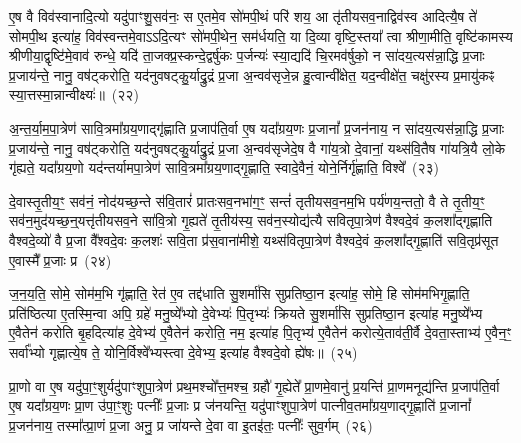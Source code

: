 ए॒ष वै विव॑स्वानादि॒त्यो यदु॑पाꣳशु॒सव॑नः॒ स ए॒तमे॒व सो॑मपी॒थं परि॑ शय॒ आ तृ॑तीयसव॒नाद्विव॑स्व आदित्यै॒ष ते॑ सोमपी॒थ इत्या॑ह॒ विव॑स्वन्तमे॒वा\-ऽऽ\-दि॒त्यꣳ सो॑मपी॒थेन॒ सम॑र्धयति॒ या दि॒व्या वृष्टि॒स्तया᳚ त्वा श्रीणा॒मीति॒ वृष्टि॑कामस्य श्रीणीया॒द्वृष्टि॑मे॒वाव॑ रुन्धे॒ यदि॑ ता॒जक्प्र॒स्कन्दे॒द्वर्\mbox{}षु॑कः प॒र्जन्यः॑ स्या॒द्यदि॑ चि॒रमव॑र्\mbox{}षुको॒ न सा॑दय॒त्यस॑न्ना॒द्धि प्र॒जाः प्र॒जाय॑न्ते॒ नानु॒ वष॑ट्करोति॒ यद॑नुवषट्कु॒र्याद्रु॒द्रं प्र॒जा अ॒न्वव॑सृजे॒न्न हु॒त्वान्वी᳚क्षेत॒ यद॒न्वीक्षे॑त॒ चक्षु॑रस्य प्र॒मायु॑कꣴ स्या॒त्तस्मा॒न्नान्वीक्ष्यः॑॥~(२२)

{\anuvakamend[{ए॒व य॒ज्ञाज्ज॒रायु॒ तदे॒व तद॒न्तर्द॑धाति॒ न स॒प्तविꣳ॑शतिश्च}]}%

अ॒न्त॒र्या॒म॒पा॒त्रेण॑ सावि॒त्रमा᳚ग्रय॒णाद्गृ॑ह्णाति प्र॒जा\-प॑ति॒र्वा ए॒ष यदा᳚ग्रय॒णः प्र॒जानां᳚ प्र॒जन॑नाय॒ न सा॑दय॒त्यस॑न्ना॒द्धि प्र॒जाः प्र॒जाय॑न्ते॒ नानु॒ वष॑ट्करोति॒ यद॑नुवषट्कु॒र्याद्रु॒द्रं प्र॒जा अ॒न्वव॑सृजेदे॒ष वै गा॑य॒त्रो दे॒वानां॒ यथ्स॑वि॒तैष गा॑यत्रि॒यै लो॒के गृ॑ह्यते॒ यदा᳚ग्रय॒णो यद॑न्तर्यामपा॒त्रेण॑ सावि॒त्रमा᳚ग्रय॒णाद्गृ॒ह्णाति॒ स्वादे॒वैनं॒ योने॒र्निर्गृ॑ह्णाति॒ विश्वे᳚~(२३)

दे॒वास्तृ॒तीय॒ꣳ॒ सव॑नं॒ नोद॑यच्छ॒न्ते स॑वि॒तारं॑ प्रातःसव॒नभा॑ग॒ꣳ॒ सन्तं॑ तृतीयसव॒नम॒भि पर्य॑णय॒न्ततो॒ वै ते तृ॒तीय॒ꣳ॒ सव॑न॒मुद॑यच्छ॒न्॒यत्तृ॑तीयसव॒ने सा॑वि॒त्रो गृ॒ह्यते॑ तृ॒तीय॑स्य॒ सव॑न॒स्योद्य॑त्यै सवितृपा॒त्रेण॑ वैश्वदे॒वं क॒लशा᳚द्गृह्णाति वैश्वदे॒व्यो॑ वै प्र॒जा वै᳚श्वदे॒वः क॒लशः॑ सवि॒ता प्र॑स॒वाना॑मीशे॒ यथ्स॑वितृपा॒त्रेण॑ वैश्वदे॒वं क॒लशा᳚द्गृ॒ह्णाति॑ सवि॒तृप्र॑सूत ए॒वास्मै᳚ प्र॒जाः प्र~(२४)

ज॒न॒य॒ति॒ सोमे॒ सोम॑म॒भि गृ॑ह्णाति॒ रेत॑ ए॒व तद्द॑धाति सु॒शर्मा॑सि सुप्रतिष्ठा॒न इत्या॑ह॒ सोमे॒ हि सोम॑मभिगृ॒ह्णाति॒ प्रति॑ष्ठित्या ए॒तस्मि॒न्वा अपि॒ ग्रहे॑ मनु॒ष्ये᳚भ्यो दे॒वेभ्यः॑ पि॒तृभ्यः॑ क्रियते सु॒शर्मा॑सि सुप्रतिष्ठा॒न इत्या॑ह मनु॒ष्ये᳚भ्य ए॒वैतेन॑ करोति बृ॒हदित्या॑ह दे॒वेभ्य॑ ए॒वैतेन॑ करोति॒ नम॒ इत्या॑ह पि॒तृभ्य॑ ए॒वैतेन॑ करोत्ये॒ताव॑ती॒र्वै दे॒वता॒स्ताभ्य॑ ए॒वैन॒ꣳ॒ सर्वा᳚भ्यो गृह्णात्ये॒ष ते॒ योनि॒र्विश्वे᳚भ्यस्त्वा दे॒वेभ्य॒ इत्या॑ह वैश्वदे॒वो ह्ये॑षः॥~(२५)

{\anuvakamend[{विश्वे॒ प्र पि॒तृभ्य॑ ए॒वैतेन॑ करो॒त्येका॒न्नविꣳ॑श॒तिश्च॑}]}%

प्रा॒णो वा ए॒ष यदु॑पा॒ꣳ॒शुर्यदु॑पाꣳशुपा॒त्रेण॑ प्रथ॒मश्चो᳚त्त॒मश्च॒ ग्रहौ॑ गृ॒ह्येते᳚ प्रा॒णमे॒वानु॑ प्र॒यन्ति॑ प्रा॒णमनूद्य॑न्ति प्र॒जा\-प॑ति॒र्वा ए॒ष यदा᳚ग्रय॒णः प्रा॒ण उ॑पा॒ꣳ॒शुः पत्नीः᳚ प्र॒जाः प्र ज॑नयन्ति॒ यदु॑पाꣳशुपा॒त्रेण॑ पात्नीव॒तमा᳚ग्रय॒णाद्गृ॒ह्णाति॑ प्र॒जानां᳚ प्र॒जन॑नाय॒ तस्मा᳚त्प्रा॒णं प्र॒जा अनु॒ प्र जा॑यन्ते दे॒वा वा इ॒तइ॑तः॒ पत्नीः᳚ सुव॒र्गम्~(२६)

